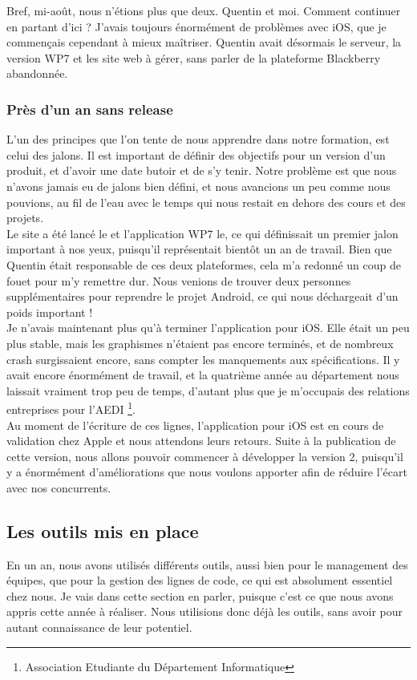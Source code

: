 \documentclass{article}
\begin{document}
		Bref, mi-août, nous n'étions plus que deux. Quentin et moi. Comment continuer en partant d'ici ? J'avais toujours énormément de problèmes avec iOS, que je commençais cependant à mieux maîtriser. Quentin avait désormais le serveur, la version WP7 et les site web à gérer, sans parler de la plateforme Blackberry abandonnée.  
\subsubsection{Près d'un an sans release}
		L'un des principes que l'on tente de nous apprendre dans notre formation, est celui des jalons. Il est important de définir des objectifs pour un version d'un produit, et d'avoir une date butoir et de s'y tenir. Notre problème est que nous n'avons jamais eu de jalons bien défini, et nous avancions un peu comme nous pouvions, au fil de l'eau avec le temps qui nous restait en dehors des cours et des projets.  \\
		
		Le site a été lancé le et l'application WP7 le, ce qui définissait un premier jalon important à nos yeux, puisqu'il représentait bientôt un an de travail. Bien que Quentin était responsable de ces deux plateformes, cela m'a redonné un coup de fouet pour m'y remettre dur. Nous venions de trouver deux personnes supplémentaires pour reprendre le projet Android, ce qui nous déchargeait d'un poids important !\\
		
		Je n'avais maintenant plus qu'à terminer l'application pour iOS. Elle était un peu plus stable, mais les graphismes n'étaient pas encore terminés, et de nombreux crash surgissaient encore, sans compter les manquements aux spécifications. Il y avait encore énormément de travail, et la quatrième année au département nous laissait vraiment trop peu de temps, d'autant plus que je m'occupais des relations entreprises pour l'AEDI \footnote{Association Etudiante du Département Informatique}. \\
		
		Au moment de l'écriture de ces lignes, l'application pour iOS est en cours de validation chez Apple et nous attendons leurs retours. Suite à la publication de cette version, nous allons pouvoir commencer à développer la version 2, puisqu'il y a énormément d'améliorations que nous voulons apporter afin de réduire l'écart avec nos concurrents. 
		
\subsection{Les outils mis en place}
		En un an, nous avons utilisés différents outils, aussi bien pour le management des équipes, que pour la gestion des lignes de code, ce qui est absolument essentiel chez nous. Je vais dans cette section en parler, puisque c'est ce que nous avons appris cette année à réaliser. Nous utilisions donc déjà les outils, sans avoir pour autant connaissance de leur potentiel.
\end{document}
